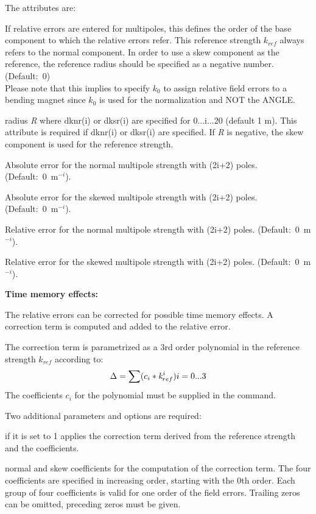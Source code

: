 The attributes are: 
\begin{madlist}
   If relative errors are entered for multipoles, this defines
  the order of the base component to which the relative  errors
  refer. This reference strength $k_{ref}$ always refers to the
  normal component. In order to use a skew component as the reference, the
  reference radius should be specified as a negative number. (Default:~0)  \\
  Please note that this implies to specify $k_0$ to assign
  relative field errors to a bending magnet since $k_0$ is used
  for the normalization and NOT the ANGLE. 

   radius {\it R} where dknr(i) or dksr(i) are specified
  for 0...i...20 (default 1 m). This attribute is required if dknr(i) or
  dksr(i) are specified. If {\it R} is negative, the skew component is
  used for the reference strength.  

   Absolute error for the normal multipole strength with
  (2i+2) poles. (Default:~0~m$^{-i}$).  

   Absolute error for the skewed multipole strength with
  (2i+2) poles. (Default:~0~m$^{-i}$).  

   Relative error for the normal multipole strength with
  (2i+2) poles. (Default:~0~m$^{-i}$).  

   Relative error for the skewed multipole strength with
  (2i+2) poles. (Default:~0~m$^{-i}$).  
\end{madlist}


{\bf Time memory effects:}

The relative errors can be corrected for possible time memory effects. A
correction term is computed and added to the relative error. 

The correction term is parametrized as a 3rd order polynomial in the
reference strength $k_{ref}$ according to:  
\[ \Delta = \sum (c_i * {\it k}^{i}_{ref})            i = 0...3\]
The coefficients $c_i$ for the polynomial must be supplied in the
command.  

Two additional parameters and options are required: 
\begin{madlist}
   if it is set to 1 applies the correction term derived from the
  reference strength and the coefficients.  

   normal and skew coefficients for the computation
  of the correction term. The four coefficients are specified in increasing
  order, starting with the 0th order. Each group of four coefficients is
  valid for one order of the field errors. Trailing zeros can be omitted,
  preceding zeros must be given.  
\end{madlist}


